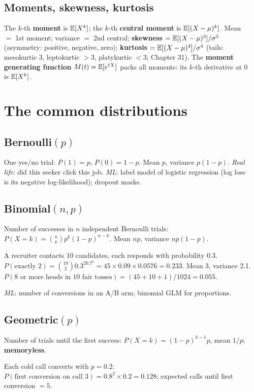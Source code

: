 \subsection{Moments, skewness, kurtosis}
The $k$-th \textbf{moment} is $\mathbb{E}[X^k]$; the $k$-th \textbf{central moment} is $\mathbb{E}[(X - \mu)^k]$. Mean $=$ 1st moment; variance $=$ 2nd central; \textbf{skewness}
$= \mathbb{E}[(X - \mu)^3]/\sigma^3$ (asymmetry: positive, negative, zero); \textbf{kurtosis} $= \mathbb{E}[(X - \mu)^4]/\sigma^4$ (tails: mesokurtic 3, leptokurtic $>3$, platykurtic
$<3$; Chapter 31). The \textbf{moment generating function} $M(t) = \mathbb{E}[e^{tX}]$ packs all moments: its $k$-th derivative at 0 is $\mathbb{E}[X^k]$.

\section{The common distributions}
\subsection{Bernoulli$(p)$}
One yes/no trial: $P(1) = p$, $P(0) = 1 - p$. Mean $p$, variance $p(1-p)$. \emph{Real life}: did this seeker click this job. \emph{ML}: label model of logistic regression
(log loss is its negative log-likelihood); dropout masks.

\subsection{Binomial$(n, p)$}
Number of successes in $n$ independent Bernoulli trials: $P(X = k) = \binom nkp^k(1-p)^{n-k}$. Mean $np$, variance $np(1-p)$.
\begin{example}[: binomial]
A recruiter contacts 10 candidates, each responds with probability 0.3. $P(\text{exactly }2) = \binom{10}{2}0.3^20.7^8 = 45\times0.09\times0.0576 = 0.233$. Mean 3, variance 2.1.
$P(\text{8 or more heads in 10 fair tosses}) = (45 + 10 + 1)/1024 = 0.055$.
\end{example}
\emph{ML}: number of conversions in an A/B arm; binomial GLM for proportions.

\subsection{Geometric$(p)$}
Number of trials until the first success: $P(X = k) = (1-p)^{k-1}p$, mean $1/p$; \textbf{memoryless}.
\begin{example}[: geometric]
Each cold call converts with $p = 0.2$: $P(\text{first conversion on call 3}) = 0.8^2\times0.2 = 0.128$; expected calls until first conversion $= 5$.
\end{example}

